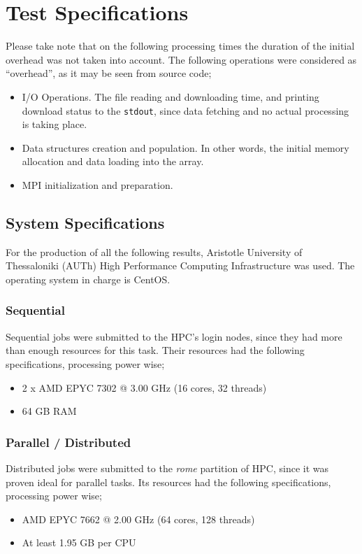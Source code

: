\documentclass[11pt]{article}
\begin{document}
\section{Test Specifications}
\label{sec:orgcbabfd9}
Please take note that on the following processing times the duration of the initial overhead was not taken into account. The following operations were considered as ``overhead'', as it may be seen from source code;
\begin{itemize}
\item I/O Operations. The file reading and downloading time, and printing download status to the \texttt{stdout}, since data fetching and no actual processing is taking place.
\item Data structures creation and population. In other words, the initial memory allocation and data loading into the array.
\item MPI initialization and preparation.
\end{itemize}
\subsection{System Specifications}
\label{sec:orgc231db1}
For the production of all the following results, Aristotle University of Thessaloniki (AUTh) High Performance Computing Infrastructure was used. The operating system in charge is CentOS. \autocite{hpc-resources}
\subsubsection{Sequential}
\label{sec:org3a76d4b}
Sequential jobs were submitted to the HPC's login nodes, since they had more than enough resources for this task. Their resources had the following specifications, processing power wise;
\begin{itemize}
\item 2 x AMD EPYC 7302 @ 3.00 GHz (16 cores, 32 threads)
\item 64 GB RAM
\end{itemize}
\subsubsection{Parallel / Distributed}
\label{sec:org0bac350}
Distributed jobs were submitted to the \emph{rome} partition of HPC, since it was proven ideal for parallel tasks. Its resources had the following specifications, processing power wise;
\begin{itemize}
\item AMD EPYC 7662 @ 2.00 GHz (64 cores, 128 threads) \autocite{hpc-resources}
\item At least 1.95 GB per CPU
\end{itemize}
\end{document}
